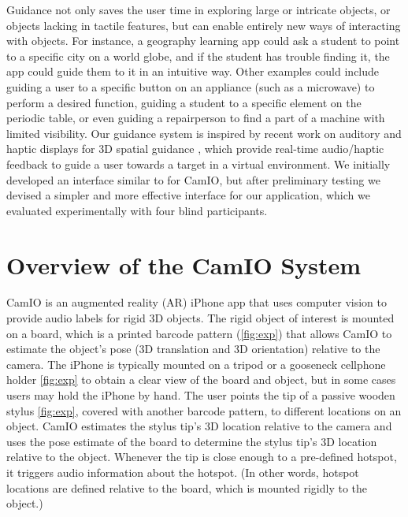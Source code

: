 \documentclass[runningheads]{res/templates/llncs}
\begin{document}
Guidance not only saves the user time in exploring large or intricate
objects, or objects lacking in tactile features, but can enable entirely
new ways of interacting with objects. For instance, a geography learning
app could ask a student to point to a specific city on a world globe,
and if the student has trouble finding it, the app could guide them to
it in an intuitive way. Other examples could include guiding a user to a
specific button on an appliance (such as a microwave) to perform a
desired function, guiding a student to a specific element on the
periodic table, or even guiding a repairperson to find a part of a
machine with limited visibility. Our guidance system is inspired by
recent work on auditory and haptic displays for 3D spatial guidance
\cite{mayAuditoryDisplaysFacilitate2019,guezou-philippePrototypingEvaluatingSensory2018},
which provide real-time audio/haptic feedback to guide a user towards a
target in a virtual environment. We initially developed an interface
similar to \cite{mayAuditoryDisplaysFacilitate2019} for CamIO, but after
preliminary testing we devised a simpler and more effective interface
for our application, which we evaluated experimentally with four blind
participants.

\hypertarget{overview}{%
\section{Overview of the CamIO System}\label{overview}}

CamIO is an augmented reality (AR) iPhone app that uses computer vision
to provide audio labels for rigid 3D objects. The rigid object of
interest is mounted on a board, which is a printed barcode pattern
(\ref{fig:exp}) that allows CamIO to estimate the object's pose (3D
translation and 3D orientation) relative to the camera. The iPhone is
typically mounted on a tripod or a gooseneck cellphone holder
\ref{fig:exp} to obtain a clear view of the board and object, but in
some cases \cite{coughlanTowardsAccessibleAudioLabeling2020} users may
hold the iPhone by hand. The user points the tip of a passive wooden
stylus \ref{fig:exp}, covered with another barcode pattern, to different
locations on an object. CamIO estimates the stylus tip's 3D location
relative to the camera and uses the pose estimate of the board to
determine the stylus tip's 3D location relative to the object. Whenever
the tip is close enough to a pre-defined hotspot, it triggers audio
information about the hotspot. (In other words, hotspot locations are
defined relative to the board, which is mounted rigidly to the object.)
\end{document}
